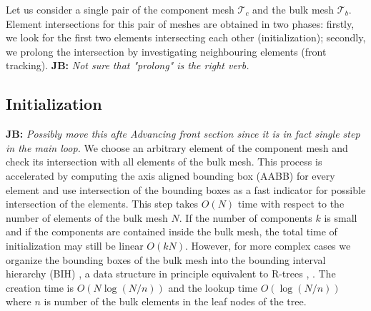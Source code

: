 \documentclass{elsarticle}
\newcommand{\noteJB}[1]{{\color{Blue} \textbf{JB: } \textit{#1}}}
\begin{document}
Let us consider a single pair of the component mesh $\mathcal T_c$ and the bulk mesh $\mathcal T_b$. 
Element intersections for this pair of meshes are obtained in two phases: firstly, we look for the first two elements intersecting each other (initialization); 
secondly, we prolong the intersection by investigating neighbouring elements (front tracking).
\noteJB{Not sure that "prolong" is the right verb.}



\subsection{Initialization}
\label{sec:initialization}
\noteJB{Possibly move this afte Advancing front section since it is in fact single step in the main loop.}
We choose an arbitrary element of the component mesh and check its intersection with all elements of the bulk mesh.
This process is accelerated by computing the axis aligned bounding box (AABB) for every element and use intersection of the bounding boxes
as a fast indicator for possible intersection of the elements. This step takes $O(N)$ time with respect to the number of elements of the bulk mesh $N$.
If the number of components $k$ is small and if the components are contained inside the bulk mesh, the total time of initialization may still be linear $O(kN)$. However,
for more complex cases we organize the bounding boxes of the bulk mesh into the bounding interval hierarchy (BIH) \cite{EGWR:EGSR06:139-149},
a data structure in principle equivalent 
to R-trees \cite{guttman_r-trees:_1984}, \cite{nam_comparative_2004}. The creation time is $O(N\log(N/n))$ and the lookup time $O(\log(N/n))$ where $n$ is number
of the bulk elements in the leaf nodes of the tree.
 
\end{document}
